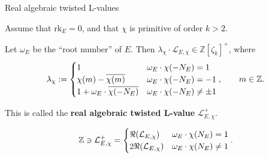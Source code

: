 \documentclass[10pt]{beamer}
\begin{document}
\begin{frame}[t]{Real algebraic twisted L-values}

Assume that $ \mathrm{rk}_E = 0 $, and that $ \chi $ is primitive of order $ k > 2 $.

\pause

\vspace{0.5cm}

\begin{lemma}
Let $ \omega_E $ be the ``root number'' of $ E $. Then $ \lambda_\chi \cdot \mathcal{L}_{E, \chi} \in \mathbb{Z}[\zeta_k]^+ $, where
\vspace{-0.2cm} $$ \vspace{-0.2cm} \lambda_\chi :=
\begin{cases}
1 & \omega_E \cdot \chi(-N_E) = 1 \\
\chi(m) - \overline{\chi(m)} & \omega_E \cdot \chi(-N_E) = -1 \\
1 + \omega_E \cdot \overline{\chi(-N_E)} & \omega_E \cdot \chi(-N_E) \ne \pm 1
\end{cases},
\qquad m \in \mathbb{Z}. $$
\end{lemma}

\pause

This is called the \textbf{real algebraic twisted L-value} $ \mathcal{L}_{E, \chi}^+ $.

\pause

\begin{example}[$ k = 3 $]
\vspace{-0.2cm} $$ \vspace{-0.2cm} \mathbb{Z} \ni \mathcal{L}_{E, \chi}^+ =
\begin{cases}
\Re(\mathcal{L}_{E, \chi}) & \omega_E \cdot \chi(N_E) = 1 \\
2\Re(\mathcal{L}_{E, \chi}) & \omega_E \cdot \chi(N_E) \ne 1
\end{cases}.
$$
\end{example}

\end{frame}
\end{document}
